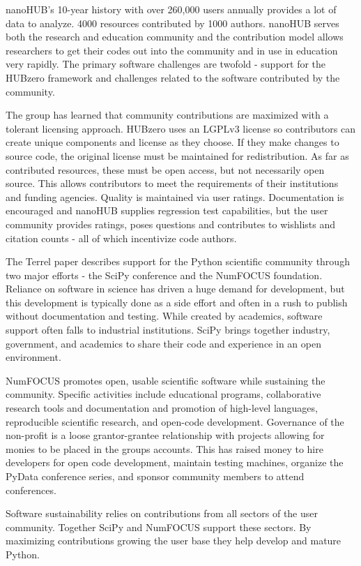 \documentclass[11pt, oneside]{amsart}
\begin{document}
nanoHUB's 10-year history with over 260,000 users annually provides a lot of
data to analyze. 4000 resources contributed by 1000 authors. nanoHUB serves
both the research and education community and the contribution model allows
researchers to get their codes out into the community and in use in education
very rapidly. The primary software challenges are twofold - support for the
HUBzero framework and challenges related to the software contributed by the
community.

The group has learned that community contributions are maximized with a
tolerant licensing approach. HUBzero uses an LGPLv3 license so contributors can
create unique components and license as they choose. If they make changes to
source code, the original license must be maintained for redistribution. As far
as contributed resources, these must be open access, but not necessarily open
source. This allows contributors to meet the requirements of their institutions
and funding agencies. Quality is maintained via user ratings. Documentation is
encouraged and nanoHUB supplies regression test capabilities, but the user
community provides ratings, poses questions and contributes to wishlists and
citation counts - all of which incentivize code authors.

The Terrel paper describes support for the Python scientific community through
two major efforts - the SciPy conference and the NumFOCUS foundation. Reliance
on software in science has driven a huge demand for development, but this
development is typically done as a side effort and often in a rush to publish
without documentation and testing. While created by academics, software support
often falls to industrial institutions. SciPy brings together industry,
government, and academics to share their code and experience in an open
environment.

NumFOCUS promotes open, usable scientific software while sustaining the
community. Specific activities include educational programs, collaborative
research tools and documentation and promotion of high-level languages,
reproducible scientific research, and open-code development. Governance of the
non-profit is a loose grantor-grantee relationship with projects allowing for
monies to be placed in the groups accounts. This has raised money to hire
developers for open code development, maintain testing machines, organize the
PyData conference series, and sponsor community members to attend conferences.

Software sustainability relies on contributions from all sectors of the user
community. Together SciPy and NumFOCUS support these sectors. By maximizing
contributions growing the user base they help develop and mature Python.
\end{document}
